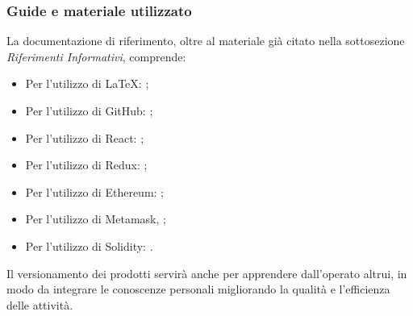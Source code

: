 \documentclass[NormeDiProgetto.tex]{subfiles}
\begin{document}
	\subsubsection{Guide e materiale utilizzato}
	 La documentazione di riferimento, oltre al materiale già citato nella sottosezione \emph{Riferimenti Informativi}, comprende:\\
	\begin{itemize}
		\item Per l'utilizzo di \LaTeX: ;\\
		\item Per l'utilizzo di GitHub: ;\\
		\item Per l'utilizzo di React: ;\\
		\item Per l'utilizzo di Redux: ;\\
		\item Per l'utilizzo di Ethereum: ;\\
		\item Per l'utilizzo di Metamask, ;\\ 
		\item Per l'utilizzo di Solidity: .\\
	\end{itemize}
	Il versionamento dei prodotti servirà anche per apprendere dall'operato
	altrui, in modo da integrare le conoscenze personali migliorando la qualità e
	l'efficienza delle attività.
	
\end{document}
